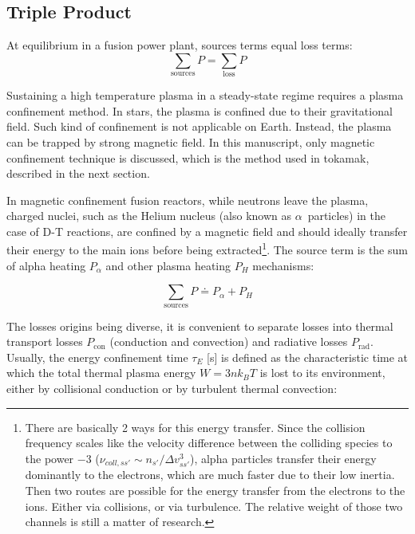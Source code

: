 \subsection{Triple Product}
At equilibrium in a fusion power plant, sources terms equal loss terms:
\begin{equation}
	\sum_{\mathrm{sources}} P = \sum_{\mathrm{loss}} P
	\label{eq:power_balance_general}
\end{equation}

Sustaining a high temperature plasma in a steady-state regime requires a plasma confinement method. In stars, the plasma is confined due to their gravitational field. Such kind of confinement is not applicable on Earth. Instead, the plasma can be trapped by strong magnetic field. In this manuscript, only magnetic confinement technique is discussed, which is the method used in tokamak, described in the next section. 

In magnetic confinement fusion reactors, while neutrons leave the plasma, charged nuclei, such as the Helium nucleus (also known as $\alpha$~particles) in the case of D-T reactions, are confined by a magnetic field and should ideally transfer their energy to the main ions before being extracted\footnote{There are basically 2 ways for this energy transfer. Since the collision frequency scales like the velocity difference between the colliding species to the power $-3$ ($\nu_{coll,ss'}\sim n_{s'}/\Delta v_{ss'}^3$), alpha particles transfer their energy dominantly to the electrons, which are much faster due to their low inertia. Then two routes are possible for the energy transfer from the electrons to the ions. Either via collisions, or via turbulence. The relative weight of those two channels is still a matter of research.}. The source term is the sum of alpha heating $P_\alpha$ and other plasma heating $P_{H}$ mechanisms:

\begin{equation}
\sum_{\mathrm{sources}} P
	\doteq 
	P_\alpha + P_{H} 
	\label{eq:sources}
\end{equation}

The losses origins being diverse, it is convenient to separate losses into thermal transport losses $P_{\mathrm{con}}$ (conduction and convection) and radiative losses $P_{\mathrm{rad}}$. Usually, the energy confinement time $\tau_E$ [\si{s}] is defined as the characteristic time at which the total thermal plasma energy $W=3 n k_B T$ is lost to its environment, either by collisional conduction or by turbulent thermal convection:

